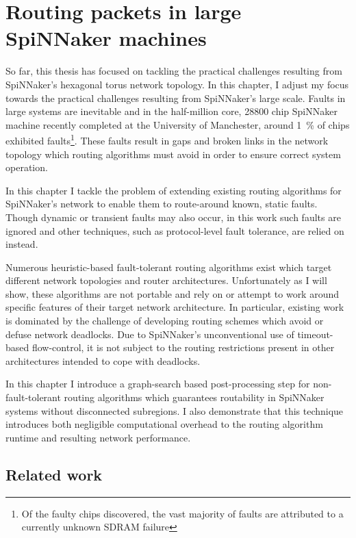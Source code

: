 \chapter{Routing packets in large SpiNNaker machines}
	
	So far, this thesis has focused on tackling the practical challenges
	resulting from SpiNNaker's hexagonal torus network topology. In this chapter,
	I adjust my focus towards the practical challenges resulting from SpiNNaker's
	large scale. Faults in large systems are inevitable and in the half-million
	core, \num{28800} chip SpiNNaker machine recently completed at the University
	of Manchester, around \SI{1}{\percent} of chips exhibited faults\footnote{Of
	the faulty chips discovered, the vast majority of faults are attributed to a
	currently unknown SDRAM failure}. These faults result in gaps and broken
	links in the network topology which routing algorithms must avoid in order to
	ensure correct system operation.
	
	In this chapter I tackle the problem of extending existing routing algorithms
	for SpiNNaker's network to enable them to route-around known, static faults.
	Though dynamic or transient faults may also occur, in this work such faults
	are ignored and other techniques, such as protocol-level fault tolerance, are
	relied on instead.
	
	Numerous heuristic-based fault-tolerant routing algorithms exist which target
	different network topologies and router architectures. Unfortunately as I
	will show, these algorithms are not portable and rely on or attempt to work
	around specific features of their target network architecture. In particular,
	existing work is dominated by the challenge of developing routing schemes
	which avoid or defuse network deadlocks. Due to SpiNNaker's unconventional
	use of timeout-based flow-control, it is not subject to the routing
	restrictions present in other architectures intended to cope with deadlocks.
	
	In this chapter I introduce a graph-search based post-processing step for
	non-fault-tolerant routing algorithms which guarantees routability in
	SpiNNaker systems without disconnected subregions. I also demonstrate that
	this technique introduces both negligible computational overhead to the
	routing algorithm runtime and resulting network performance.
	
	\section{Related work}
		
